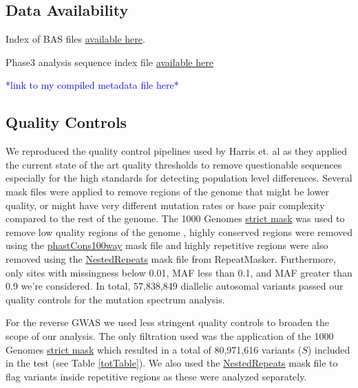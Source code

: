 \documentclass[9pt,lineno]{elife}
\newcommand{\todo}[1]{\textcolor{blue}{*#1*}}
\begin{document}
\subsection{Data Availability}

Index of BAS files \href{http://ftp.1000genomes.ebi.ac.uk/vol1/ftp/data_collections/1000_genomes_project/1000genomes.low_coverage.GRCh38DH.alignment.index}{available here}.

Phase3 analysis sequence index file  \href{http://ftp.1000genomes.ebi.ac.uk/vol1/ftp/phase3/20130502.phase3.analysis.sequence.index}{available here} 

\todo{link to my compiled metadata file here}

\subsection{Quality Controls}
We reproduced the quality control pipelines used by Harris et. al as they applied the current state of the art quality thresholds to remove questionable sequences especially for the high standards for detecting population level differences. 
Several mask files were applied to remove regions of the genome that might be lower quality, or might have very different mutation rates or base pair complexity compared to the rest of the genome. 
The  1000 Genomes \href{http://ftp.1000genomes.ebi.ac.uk/vol1/ftp/release/20130502/supporting/accessible_genome_masks/20141020.strict_mask.whole_genome.bed}{strict mask} was used to remove low quality regions of the genome , highly conserved regions were removed using the \href{http://hgdownload.cse.ucsc.edu/goldenPath/hg19/database/phastConsElements100way.txt.gz}{phastCons100way} mask file and highly repetitive regions were also removed using the \href{http://hgdownload.cse.ucsc.edu/goldenpath/hg19/database/nestedRepeats.txt.gz}{NestedRepeats} mask file from RepeatMasker. 
Furthermore, only sites with missingness below 0.01, MAF less than 0.1, and MAF greater than 0.9 we're considered.
In total, 57,838,849 diallelic autosomal variants passed our quality controls for the mutation spectrum analysis.

For the reverse GWAS we used less stringent quality controls to broaden the scope of our analysis. The only filtration used was the application of the  1000 Genomes \href{http://ftp.1000genomes.ebi.ac.uk/vol1/ftp/release/20130502/supporting/accessible_genome_masks/20141020.strict_mask.whole_genome.bed}{strict mask} which resulted in a total of 80,971,616 variants ($S$) included in the test (see Table \ref{totTable}). We also used the \href{http://hgdownload.cse.ucsc.edu/goldenpath/hg19/database/nestedRepeats.txt.gz}{NestedRepeats} mask file to flag variants inside repetitive regions as these were analyzed separately.
\end{document}
